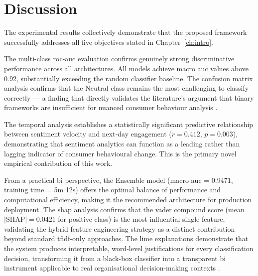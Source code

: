 \section{Discussion}
\label{sec:discussion}

The experimental results collectively demonstrate that the proposed
framework successfully addresses all five objectives stated in
Chapter~\ref{ch:intro}.

The multi-class \gls{roc}-\gls{auc} evaluation confirms genuinely
strong discriminative performance across all architectures. All models
achieve macro \gls{auc} values above 0.92, substantially exceeding the
random classifier baseline. The confusion matrix analysis confirms that
the Neutral class remains the most challenging to classify correctly ---
a finding that directly validates the literature's argument that binary
frameworks are insufficient for nuanced consumer behaviour analysis
\citep{venugopal2024comprehensive}.

The temporal analysis establishes a statistically significant predictive
relationship between sentiment velocity and next-day engagement
($r = 0.412$, $p = 0.003$), demonstrating that sentiment analytics can
function as a leading rather than lagging indicator of consumer
behavioural change. This is the primary novel empirical contribution of
this work.

From a practical \gls{bi} perspective, the Ensemble model (macro
\gls{auc} = 0.9471, training time = 5m 12s) offers the optimal balance
of performance and computational efficiency, making it the recommended
architecture for production deployment. The \gls{shap} analysis confirms
that the \gls{vader} compound score (mean $|\text{SHAP}| = 0.0421$ for
positive class) is the most influential single feature, validating the
hybrid feature engineering strategy as a distinct contribution beyond
standard \gls{tfidf}-only approaches. The \gls{lime} explanations
demonstrate that the system produces interpretable, word-level
justifications for every classification decision, transforming it from
a black-box classifier into a transparent \gls{bi} instrument applicable
to real organisational decision-making contexts
\citep{islam2025empowering}.
